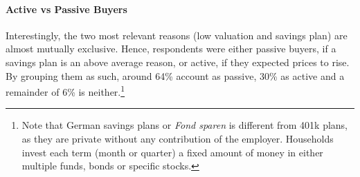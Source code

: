 \documentclass[ProjectABM]{subfiles}
\begin{document}




\paragraph{Active vs Passive Buyers}
Interestingly, the two most relevant reasons (low valuation and savings plan) are almost mutually exclusive. Hence, respondents were either passive buyers, if a savings plan is an above average reason, or active, if they expected prices to rise. By grouping them as such, around 64\% account as passive, 30\% as active and a remainder of 6\% is neither.\footnote{Note that German savings plans or \textit{Fond sparen} is different from 401k plans, as they are private without any contribution of the employer. Households invest each term (month or quarter) a fixed amount of money in either multiple funds, bonds or specific stocks.}

\end{document}

